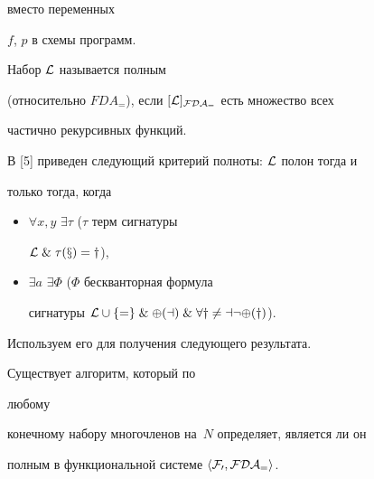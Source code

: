 вместо переменных 


$f$, $p$ в схемы программ. 


 


\begin{defn} Набор $\cal L$ называется полным 


(относительно $FDA_=$), если $[\cal L]_{FDA_=}$ есть множество всех 


частично рекурсивных функций. 


\end{defn} 


 


В [5] приведен следующий критерий полноты: $\cal L$ полон тогда и 


только тогда, когда 


\begin{itemize} 


\item[1)] $\forall x,y$ $\exists\tau$ ($\tau$ терм сигнатуры 


$\cal L\;\&\;\tau(x)=y$), 


\item[2)] $\exists a$ $\exists\Phi$ ($\Phi$ бескванторная формула 


сигнатуры $\cal L\cup\{=\}\;\&\;\Phi(a)\;\&\;\forall y\ne a\neg\Phi(y)$). 


\end{itemize} 


 


Используем его для получения следующего результата. 


 


\begin{thmnonum} Существует алгоритм, который по 


любому 


конечному набору многочленов на~$N$ определяет, является ли он 


полным в функциональной системе $\langle\cal F_0,FDA_=\rangle$. 


\end{thmnonum} 


 


